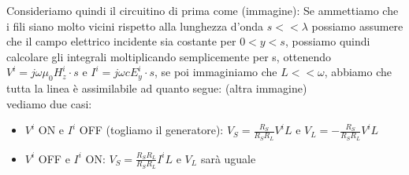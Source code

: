 \documentclass[oneside, 12pt]{extbook}
\begin{document}
Consideriamo quindi il circuitino di prima come (immagine):
Se ammettiamo che i fili siano molto vicini rispetto alla lunghezza d'onda $s << \lambda$ possiamo assumere che il campo elettrico incidente sia costante per $0 < y < s$, possiamo quindi calcolare gli integrali moltiplicando semplicemente per s, ottenendo $V^i = j \omega \mu_0 H_z^i \cdot s$ e $I^i = j \omega c E_y^i \cdot s$, se poi immaginiamo che $L << \omega$, abbiamo che tutta la linea è assimilabile ad quanto segue: (altra immagine)\\
vediamo due casi:
\begin{itemize}
	\item $V^i$ ON e $I^i$ OFF (togliamo il generatore): $V_S = \frac{R_S}{R_S R_L} V^i L$ e $V_L = -\frac{R_S}{R_S R_L} V^i L$
	\item $V^i$ OFF e $I^i$ ON: $V_S = \frac{R_S R_L}{R_S R_L} I^i L$ e $V_L$ sarà uguale 
\end{itemize}
\end{document}

